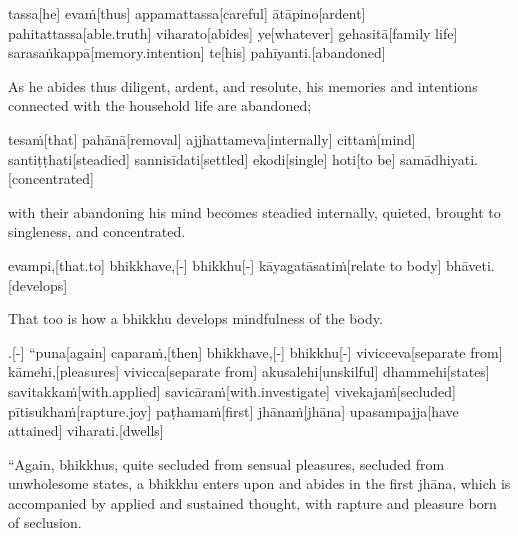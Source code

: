 \begin{samepage}
\begingl[glneveryline={\PaliGlossA,\PaliGlossB}]
tassa[he] evaṁ[thus] appamattassa[careful] ātāpino[ardent] pahitattassa[able.truth] viharato[abides] ye[whatever] gehasitā[family life] sarasaṅkappā[memory.intention] te[his] pahīyanti.[abandoned]
\endgl
\nopagebreak
\linespread{0.5}
\begin{spacin}{0.2}
{\PaliGlossFT As he abides thus diligent, ardent, and resolute, his memories and intentions connected with the household life are abandoned;}
\end{spacin}
\vskip 12pt
\end{samepage}
\begin{samepage}
\begingl[glneveryline={\PaliGlossA,\PaliGlossB}]
tesaṁ[that] pahānā[removal] ajjhattameva[internally] cittaṁ[mind] santiṭṭhati[steadied] sannisīdati[settled] ekodi[single] hoti[to be] samādhiyati.[concentrated]
\endgl
\nopagebreak
\linespread{0.5}
\begin{spacin}{0.2}
{\PaliGlossFT with their abandoning his mind becomes steadied internally, quieted, brought to singleness, and concentrated.}
\end{spacin}
\vskip 12pt
\end{samepage}
\begin{samepage}
\begingl[glneveryline={\PaliGlossA,\PaliGlossB}]
evampi,[that.to] bhikkhave,[-] bhikkhu[-] kāyagatāsatiṁ[relate to body] bhāveti.[develops]
\endgl
\nopagebreak
\linespread{0.5}
\begin{spacin}{0.2}
{\PaliGlossFT That too is how a bhikkhu develops mindfulness of the body.}
\end{spacin}
\vskip 12pt
\end{samepage}
\vskip 0.2in
\begin{samepage}
.[-] “puna[again] caparaṁ,[then] bhikkhave,[-] bhikkhu[-] vivicceva[separate from] kāmehi,[pleasures] vivicca[separate from] akusalehi[unskilful] dhammehi[states] savitakkaṁ[with.applied] savicāraṁ[with.investigate] vivekajaṁ[secluded] pītisukhaṁ[rapture.joy] paṭhamaṁ[first] jhānaṁ[jhāna] upasampajja[have attained] viharati.[dwells]
\endgl
\nopagebreak
\linespread{0.5}
\begin{spacin}{0.2}
{\PaliGlossFT “Again, bhikkhus, quite secluded from sensual pleasures, secluded from unwholesome states, a bhikkhu enters upon and abides in the first jhāna, which is accompanied by applied and sustained thought, with rapture and pleasure born of seclusion.}
\end{spacin}
\vskip 12pt
\end{samepage}
